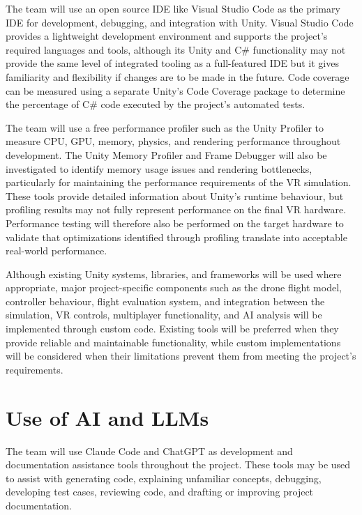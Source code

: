 \documentclass{article}
\begin{document}
\vspace{0.75em}
\noindent The team will use an open source IDE like Visual Studio Code as the primary IDE for development, debugging, and integration with Unity. Visual Studio Code provides a lightweight development environment and supports the project's required languages and tools, although its Unity and C\# functionality may not provide the same level of integrated tooling as a full-featured IDE but it gives familiarity and flexibility if changes are to be made in the future. Code coverage can be measured using a separate Unity's Code Coverage package to determine the percentage of C\# code executed by the project's automated tests. 

\vspace{0.75em}

\noindent The team will use a free performance profiler such as the Unity Profiler to measure CPU, GPU, memory, physics, and rendering performance throughout development. The Unity Memory Profiler and Frame Debugger will also be investigated to identify memory usage issues and rendering bottlenecks, particularly for maintaining the performance requirements of the VR simulation. These tools provide detailed information about Unity's runtime behaviour, but profiling results may not fully represent performance on the final VR hardware. Performance testing will therefore also be performed on the target hardware to validate that optimizations identified through profiling translate into acceptable real-world performance.

\vspace{0.75em}

\noindent Although existing Unity systems, libraries, and frameworks will be used where appropriate, major project-specific components such as the drone flight model, controller behaviour, flight evaluation system, and integration between the simulation, VR controls, multiplayer functionality, and AI analysis will be implemented through custom code. Existing tools will be preferred when they provide reliable and maintainable functionality, while custom implementations will be considered when their limitations prevent them from meeting the project's requirements. 




\section{Use of AI and LLMs}

\noindent The team will use Claude Code and ChatGPT as development and documentation assistance tools throughout the project. These tools may be used to assist with generating code, explaining unfamiliar concepts, debugging, developing test cases, reviewing code, and drafting or improving project documentation.
\end{document}
